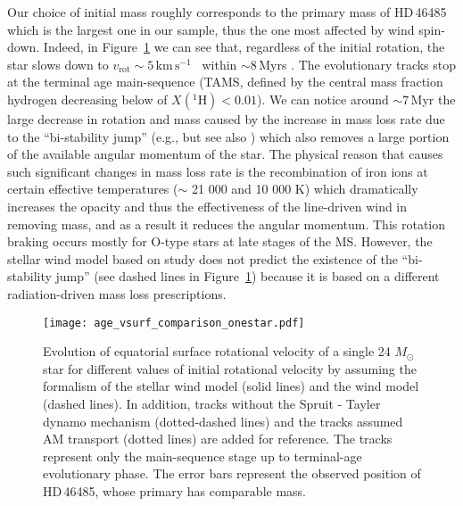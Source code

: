 \documentclass{aa}
\newcommand{\kms}{$\mathrm{km\,s^{-1}}$}
\DeclareRobustCommand{\Figref}[1]{Figure~\ref{#1}}
\begin{document}
Our choice of initial mass roughly corresponds to the primary
  mass of HD\,46485 which is the largest one in our sample, thus the one
most affected by wind spin-down. Indeed, in
\Figref{fig:v_surf_one_star} we can see that, regardless of the
initial rotation, the star slows down to
$v_\mathrm{rot}\sim 5$\,\kms~ within $\sim$8\,Myrs \citep[solid lines,][]{Vink_2001}. The evolutionary tracks stop at the
terminal age main-sequence (TAMS, defined by the central mass fraction
hydrogen decreasing below of $X(^{1}\mathrm{H})<0.01$). We can
notice around $\sim7$\,Myr the large decrease in rotation and mass caused by
  the increase in mass loss rate due to the ``bi-stability jump''
(e.g.,\citealt{Vink_2001} but see also \citealt{bjorklund:21})
which also removes a large portion of the available angular
momentum of the star. The physical reason that causes
such significant changes in mass loss rate is the recombination of
  iron ions at certain effective temperatures ($\sim$ 21 000 and 10
000 K) which dramatically increases the opacity and thus the
  effectiveness of the line-driven wind in removing mass, and as a result it reduces the angular momentum.
This rotation braking  occurs mostly for O-type stars at late stages of the MS. However, the stellar wind model based on \citet{Bjorklund_2023} study does not predict the existence of the ``bi-stability jump'' (see dashed lines in \Figref{fig:v_surf_one_star}) because it is based on a different radiation-driven mass loss prescriptions.


\begin{figure}[!ht]
  \centering
  \texttt{[image: age\_vsurf\_comparison\_onestar.pdf]}
  \caption{Evolution of equatorial surface rotational velocity of a
    single 24 $M_{\odot}$ star for different values of initial
    rotational velocity by assuming the formalism of the \citet{Vink_2001} stellar wind model (solid lines) and the \citet{Bjorklund_2023} wind model (dashed lines). In addition, tracks without the Spruit - Tayler dynamo mechanism (dotted-dashed lines) and the tracks assumed \citet{fuller:19} AM transport (dotted lines) are added for reference.
 The tracks represent only the main-sequence
    stage up to terminal-age evolutionary phase. The error bars
    represent the observed position of HD\,46485, whose primary has comparable mass.}
  \label{fig:v_surf_one_star}
\end{figure}
\end{document}
